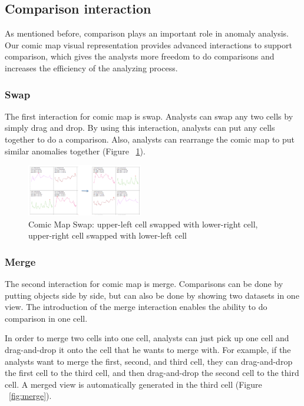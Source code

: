\documentclass{vgtc}                          %
\begin{document}
\subsection{Comparison interaction}
As mentioned before, comparison plays an important role in anomaly analysis. Our comic map visual representation provides advanced interactions to support comparison, which gives the analysts more freedom to do comparisons and increases the efficiency of the analyzing process.

\subsubsection{Swap}
The first interaction for comic map is swap. Analysts can swap any two cells by simply drag and drop. By using this interaction, analysts can put any cells together to do a comparison.  Also, analysts can rearrange the comic map to put similar anomalies together (Figure ~\ref{fig:swap}).

\begin{figure}[htb]
	\centering
	\includegraphics[width=0.45\textwidth]{swap.jpg}
	\caption{Comic Map Swap: upper-left cell swapped with lower-right cell, upper-right cell swapped with lower-left cell}
	\label{fig:swap}
\end{figure}

\subsubsection{Merge}
The second interaction for comic map is merge. Comparisons can be done by putting objects side by side, but can also be done by showing two datasets in one view. The introduction of the merge interaction enables the ability to do comparison in one cell.

In order to merge two cells into one cell, analysts can just pick up one cell and drag-and-drop it onto the cell that he wants to merge with. For example, if the analysts want to merge the first, second, and third cell, they can drag-and-drop the first cell to the third cell, and then drag-and-drop the second cell to the third cell. A merged view is automatically generated in the third cell (Figure ~\ref{fig:merge}).
\end{document}
